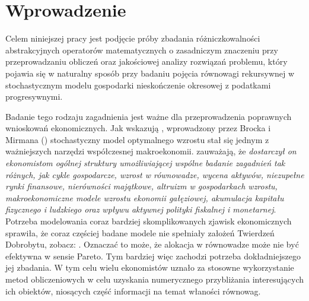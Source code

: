 
	
\renewcommand\bibname{Spis literatury}


\begin{small}
\tableofcontents
\end{small}

\chapter*{Wprowadzenie}

	Celem niniejszej pracy jest podjęcie próby zbadania różniczkowalności abstrakcyjnych operatorów matematycznych o zasadniczym znaczeniu przy przeprowadzaniu obliczeń oraz jakościowej analizy rozwiązań problemu, który pojawia się w naturalny sposób przy badaniu pojęcia równowagi rekursywnej w stochastycznym modelu gospodarki nieskończenie okresowej z podatkami progresywnymi.	
	
	Badanie tego rodzaju zagadnienia jest ważne dla przeprowadzenia poprawnych wnioskowań ekonomicznych. Jak wskazują \citet*{Reffett_2008}, wprowadzony przez Brocka i Mirmana (\citeyear{Brock_1972}) stochastyczny model optymalnego wzrostu stał się jednym z ważniejszych narzędzi współczesnej makroekonomii. \citet{Reffett_2008} zauważają, że {\it dostarczył on ekonomistom ogólnej struktury umożliwiającej wspólne badanie zagadnień tak różnych, jak cykle gospodarcze, wzrost w równowadze, wycena aktywów, niezupełne rynki finansowe, nierówności majątkowe, altruizm w gospodarkach wzrostu, makroekonomiczne modele wzrostu ekonomii gałęziowej, akumulacja kapitału fizycznego i ludzkiego oraz wpływu aktywnej polityki fiskalnej i monetarnej}. Potrzeba modelowania coraz bardziej skomplikowanych zjawisk ekonomicznych sprawiła, że coraz częściej badane modele nie spełniały założeń Twierdzeń Dobrobytu, zobacz: \citet*[][str. 451]{Prescott}. Oznaczać to może, że alokacja w równowadze może nie być efektywna w sensie Pareto. Tym bardziej więc zachodzi potrzeba dokładniejszego jej zbadania. W tym celu wielu ekonomistów uznało za stosowne wykorzystanie metod obliczeniowych w celu uzyskania numerycznego przybliżania interesujących ich obiektów, niosących część informacji na temat właności równowag. 
	
